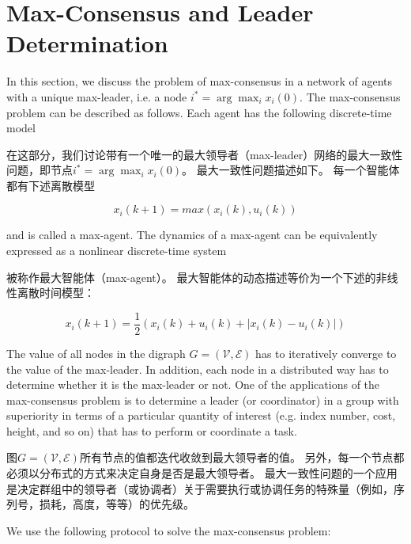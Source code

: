 \documentclass{article}
\begin{document}
\section{Max-Consensus and Leader Determination}
{\color[gray]{0.5}
\noindent In this section, we discuss the problem of max-consensus in a network of agents with a unique max-leader, i.e. a node $i^*=\arg\max_ix_i(0)$. 
The max-consensus problem can be described as follows. 
Each agent has the following discrete-time model
}

\noindent 在这部分，我们讨论带有一个唯一的最大领导者（max-leader）网络的最大一致性问题，即节点$i^*=\arg\max_ix_i(0)$。
最大一致性问题描述如下。
每一个智能体都有下述离散模型

\begin{equation}
    \tag{41}
    \label{41}
    x_i(k+1)=max(x_i(k),u_i(k))
\end{equation}

{\color[gray]{0.5}
\noindent and is called a max-agent. 
The dynamics of a max-agent can be equivalently expressed as a nonlinear discrete-time system
}

\noindent 被称作最大智能体（max-agent）。
最大智能体的动态描述等价为一个下述的非线性离散时间模型：

\begin{equation}
    \tag{42}
    \label{42}
    x_i(k+1) = \frac{1}{2}(x_i(k)+u_i(k)+|x_i(k)-u_i(k)|)
\end{equation}

{\color[gray]{0.5}
\noindent The value of all nodes in the digraph $G=(\mathcal{V},\mathcal{E})$ has to iteratively converge to the value of the max-leader. 
In addition, each node in a distributed way has to determine whether it is the max-leader or not. 
One of the applications of the max-consensus problem is to determine a leader (or coordinator) in a group with superiority in terms of a particular quantity of interest (e.g. index number, cost, height, and so on) that has to perform or coordinate a task.
}

\noindent 图$G=(\mathcal{V},\mathcal{E})$所有节点的值都迭代收敛到最大领导者的值。
另外，每一个节点都必须以分布式的方式来决定自身是否是最大领导者。
最大一致性问题的一个应用是决定群组中的领导者（或协调者）关于需要执行或协调任务的特殊量（例如，序列号，损耗，高度，等等）的优先级。

{\color[gray]{0.5}
We use the following protocol to solve the max-consensus problem:
}
\end{document}
